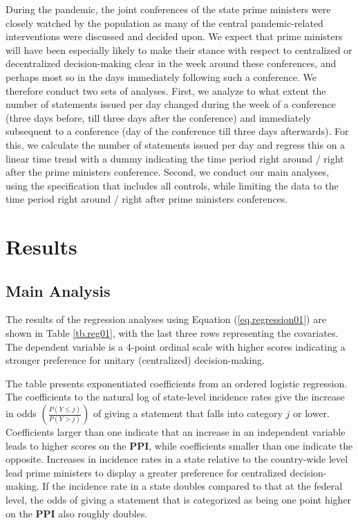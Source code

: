 \documentclass[authoryear,12pt, 3p]{elsarticle} %
\theoremstyle{break}
\begin{document}
During the pandemic, the joint conferences of the state prime ministers were closely watched by the population as many of the central pandemic-related interventions were discussed and decided upon. We expect that prime ministers will have been especially likely to make their stance with respect to centralized or decentralized decision-making clear in the week around these conferences, and perhaps most so in the days immediately following such a conference. We therefore conduct two sets of analyses. First, we analyze to what extent the number of statements issued per day changed during the week of a conference (three days before, till three days after the conference) and immediately subsequent to a conference (day of the conference till three days afterwards). For this, we calculate the number of statements issued per day and regress this on a linear time trend with a dummy indicating the time period right around / right after the prime ministers conference. Second, we conduct our main analyses, using the specification that includes all controls, while limiting the data to the time period right around / right after prime ministers conferences.

\section{Results}\label{sec.results}
\subsection{Main Analysis}

The results of the regression analyses using Equation (\ref{eq.regression01}) are shown in Table \ref{tb.reg01}, with the last three rows representing the covariates. The dependent variable is a 4-point ordinal scale with higher scores indicating a stronger preference for unitary (centralized) decision-making.



The table presents exponentiated coefficients from an ordered logistic regression. The coefficients to the natural log of state-level incidence rates give the increase in odds $\left( \frac{P(Y \leq j)}{P(Y > j)} \right)$ of giving a statement that falls into category $j$ or lower. Coefficients larger than one indicate that an increase in an independent variable leads to higher scores on the \textbf{PPI}, while coefficients smaller than one indicate the opposite. Increases in incidence rates in a state relative to the country-wide level lead prime ministers to display a greater preference for centralized decision-making. If the incidence rate in a state doubles compared to that at the federal level, the odds of giving a statement that is categorized as being one point higher on the \textbf{PPI} also roughly doubles.
\end{document}
